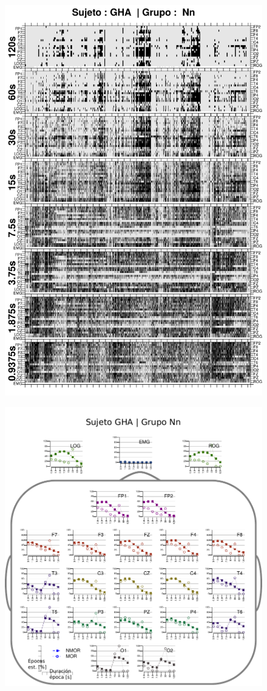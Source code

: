 \begin{figure}
\centering
\includegraphics[width=0.9\linewidth]
{./img_ejemplos/GH24031950SUENO_comp_est_.png} 
\end{figure}

\begin{figure}
\centering
\includegraphics[width=.9\linewidth]{./img_resultados/cabeza_GHA.pdf}
\end{figure}

